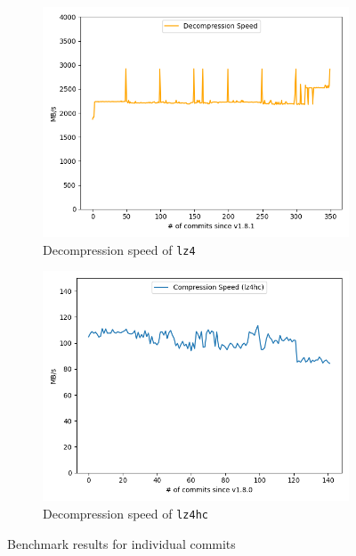 \documentclass[	runningheads,
				a4paper]{llncs}
\begin{document}
\begin{figure}[ht!]
	\centering
	\begin{subfigure}[b]{0.45\textwidth}
		\includegraphics[width=\textwidth]{graph/lz4_commits_decompression}
		\caption{Decompression speed of \texttt{lz4}}
		\label{fig:lz4_commit_bench}
	\end{subfigure}
	\begin{subfigure}[b]{0.45\textwidth}
		\includegraphics[width=\textwidth]{graph/lz4hc_commits_compression}
		\caption{Decompression speed of \texttt{lz4hc}}
		\label{fig:lz4hc_commit_bench}
	\end{subfigure}
	\caption{Benchmark results for individual commits}
\end{figure}
\end{document}
